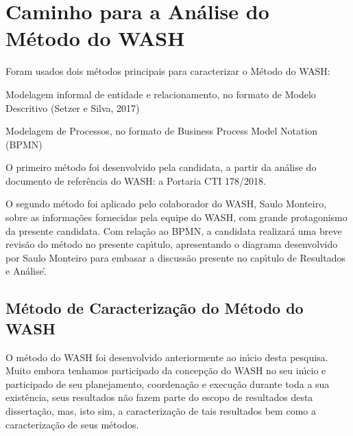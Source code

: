 \documentclass[
12pt,		%
openright,	%
twoside,  %
a4paper,			%
chapter=TITLE,		%
english,			%
french,				%
spanish,			%
brazil				%
]{USPSC-classe/USPSC_RedarTex}
\begin{document}
\section[Caminho para a An\'alise do M\'etodo do WASH]{Caminho para a An\'alise do M\'etodo do WASH}\label{Caminho para a An\'alise do M\'etodo do WASH}
Foram usados dois m\'etodos principais para caracterizar o M\'etodo do WASH:











\begin{alineas}
\item Modelagem informal de entidade e relacionamento, no formato de Modelo Descritivo  (Setzer e Silva, 2017)
\item Modelagem de Processos, no formato de Business Process Model Notation (BPMN)
\end{alineas}

O primeiro m\'etodo foi desenvolvido pela candidata, a partir da an\'alise do documento de refer\^encia do WASH: a Portaria CTI 178/2018.










O segundo m\'etodo foi aplicado pelo colaborador do WASH, Saulo Monteiro, sobre as informa\c{c}\~oes fornecidas pela equipe do WASH, com grande protagonismo da presente candidata. Com rela\c{c}\~ao ao BPMN, a candidata realizar\'a uma breve revis\~ao do m\'etodo no presente cap\'{\i}tulo, apresentando o diagrama desenvolvido por Saulo Monteiro para embasar a discuss\~ao presente no cap\'{\i}tulo de Resultados e An\'alise.\r\n










\subsection[M\'etodo de Caracteriza\c{c}\~ao do M\'etodo do WASH]{M\'etodo de Caracteriza\c{c}\~ao do M\'etodo do WASH}\label{M\'etodo de Caracteriza\c{c}\~ao do M\'etodo do WASH}
O m\'etodo do WASH foi desenvolvido anteriormente ao in\'{\i}cio desta pesquisa. Muito embora tenhamos participado da concep\c{c}\~ao do WASH no seu in\'{\i}cio e participado de seu planejamento, coordena\c{c}\~ao e execu\c{c}\~ao durante toda a sua exist\^encia, seus resultados n\~ao fazem parte do escopo de resultados desta disserta\c{c}\~ao, mas, isto sim, a caracteriza\c{c}\~ao de tais resultados bem como a caracteriza\c{c}\~ao de seus m\'etodos.
\end{document}
